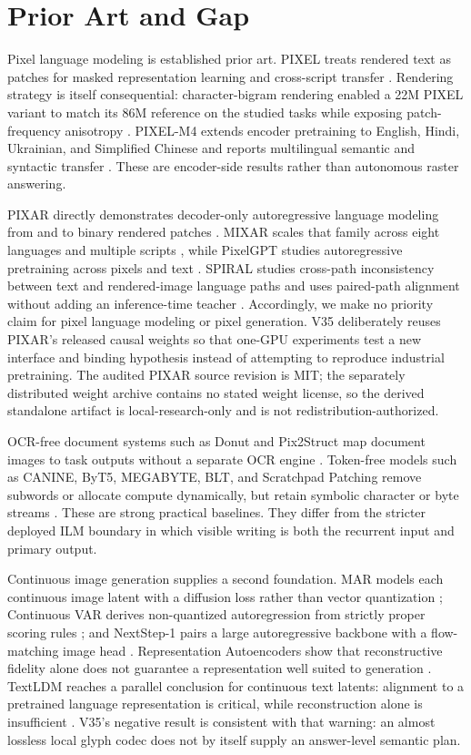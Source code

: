 \documentclass[11pt]{article}
\begin{document}
\section{Prior Art and Gap}

Pixel language modeling is established prior art. PIXEL treats rendered text as
patches for masked representation learning and cross-script transfer
\cite{pixel}. Rendering strategy is itself consequential: character-bigram
rendering enabled a 22M PIXEL variant to match its 86M reference on the studied
tasks while exposing patch-frequency anisotropy
\cite{renderingstrategies}. PIXEL-M4 extends encoder pretraining to English,
Hindi, Ukrainian, and Simplified Chinese and reports multilingual semantic and
syntactic transfer \cite{pixelm4}. These are encoder-side results rather than
autonomous raster answering.

PIXAR directly demonstrates decoder-only autoregressive language modeling from
and to binary rendered patches \cite{pixar}. MIXAR scales that family across
eight languages and multiple scripts \cite{mixar}, while PixelGPT studies
autoregressive pretraining across pixels and text \cite{pixelgpt}. SPIRAL
studies cross-path inconsistency between text and rendered-image language paths
and uses paired-path alignment without adding an inference-time teacher
\cite{spiral}. Accordingly,
we make no priority claim for pixel language modeling or pixel generation.
V35 deliberately reuses PIXAR's released causal weights so that one-GPU
experiments test a new interface and binding hypothesis instead of attempting
to reproduce industrial pretraining. The audited PIXAR source revision is MIT;
the separately distributed weight archive contains no stated weight license, so
the derived standalone artifact is local-research-only and is not
redistribution-authorized.

OCR-free document systems such as Donut and Pix2Struct map document images to
task outputs without a separate OCR engine \cite{donut,pix2struct}. Token-free
models such as CANINE, ByT5, MEGABYTE, BLT, and Scratchpad Patching remove
subwords or allocate compute dynamically, but retain symbolic character or byte
streams \cite{canine,byt5,megabyte,blt,scratchpad}. These are strong practical
baselines. They differ from the stricter deployed ILM boundary in which visible
writing is both the recurrent input and primary output.

Continuous image generation supplies a second foundation. MAR models each
continuous image latent with a diffusion loss rather than vector quantization
\cite{mar}; Continuous VAR derives non-quantized autoregression from strictly
proper scoring rules \cite{continuousvar}; and NextStep-1 pairs a large
autoregressive backbone with a flow-matching image head
\cite{nextstep}. Representation Autoencoders show that reconstructive fidelity
alone does not guarantee a representation well suited to generation
\cite{rae}. TextLDM reaches a parallel conclusion for continuous text latents:
alignment to a pretrained language representation is critical, while
reconstruction alone is insufficient \cite{textldm}. V35's negative result is
consistent with that warning: an almost lossless local glyph codec does not by
itself supply an answer-level semantic plan.
\end{document}
